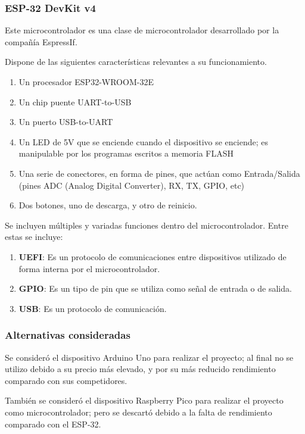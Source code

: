 \documentclass[12pt,a4paper,twoside,openright]{book}
\begin{document}
\subsubsection{ESP-32 DevKit v4}

Este microcontrolador es una clase de microcontrolador desarrollado por la compañía EspressIf. \cite{espressif-1}

Dispone de las siguientes características relevantes a su funcionamiento. \cite{espressif-1} \cite{espressif-2}

\begin{enumerate}
 \item Un procesador ESP32-WROOM-32E
 \item Un chip puente UART-to-USB
 \item Un puerto USB-to-UART
 \item Un LED de 5V que se enciende cuando el dispositivo se enciende; es manipulable por los programas escritos a memoria FLASH
 \item Una serie de conectores, en forma de pines, que actúan como Entrada/Salida (pines ADC (Analog Digital Converter), RX, TX, GPIO, etc)
 \item Dos botones, uno de descarga, y otro de reinicio.
\end{enumerate}

Se incluyen múltiples y variadas funciones dentro del microcontrolador. Entre estas se incluye:

\begin{enumerate}
  \item \textbf{UEFI}: Es un protocolo de comunicaciones entre dispositivos utilizado de forma interna por el microcontrolador.
  \item \textbf{GPIO}: Es un tipo de pin que se utiliza como señal de entrada o de salida.
  \item \textbf{USB}: Es un protocolo de comunicación.
\end{enumerate}

\subsubsection{Alternativas consideradas}

Se consideró el dispositivo Arduino Uno para realizar el proyecto; al final no se utilizo debido a su precio más elevado, y por su más reducido rendimiento comparado con sus competidores.

También se consideró el dispositivo Raspberry Pico para realizar el proyecto como microcontrolador; pero se descartó debido a la falta de rendimiento comparado con el ESP-32.
\end{document}
